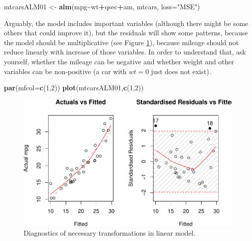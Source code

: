 \documentclass[
]{book}
\newenvironment{Shaded}{\begin{snugshade}}{\end{snugshade}}
\newcommand{\DataTypeTok}[1]{\textcolor[rgb]{0.13,0.29,0.53}{#1}}
\newcommand{\DecValTok}[1]{\textcolor[rgb]{0.00,0.00,0.81}{#1}}
\newcommand{\KeywordTok}[1]{\textcolor[rgb]{0.13,0.29,0.53}{\textbf{#1}}}
\newcommand{\NormalTok}[1]{#1}
\newcommand{\OperatorTok}[1]{\textcolor[rgb]{0.81,0.36,0.00}{\textbf{#1}}}
\newcommand{\StringTok}[1]{\textcolor[rgb]{0.31,0.60,0.02}{#1}}
\theoremstyle{definition}
\theoremstyle{definition}
\theoremstyle{definition}
\theoremstyle{definition}
\theoremstyle{remark}
\begin{document}
\begin{Shaded}
\begin{Highlighting}[]
\NormalTok{mtcarsALM01 \textless{}{-}}\StringTok{ }\KeywordTok{alm}\NormalTok{(mpg}\OperatorTok{\textasciitilde{}}\NormalTok{wt}\OperatorTok{+}\NormalTok{qsec}\OperatorTok{+}\NormalTok{am, mtcars, }\DataTypeTok{loss=}\StringTok{"MSE"}\NormalTok{)}
\end{Highlighting}
\end{Shaded}

Arguably, the model includes important variables (although there might be some others that could improve it), but the residuals will show some patterns, because the model should be multiplicative (see Figure \ref{fig:diagnostics03}), because mileage should not reduce linearly with increase of those variables. In order to understand that, ask yourself, whether the mileage can be negative and whether weight and other variables can be non-positive (a car with \(wt=0\) just does not exist).

\begin{Shaded}
\begin{Highlighting}[]
\KeywordTok{par}\NormalTok{(}\DataTypeTok{mfcol=}\KeywordTok{c}\NormalTok{(}\DecValTok{1}\NormalTok{,}\DecValTok{2}\NormalTok{))}
\KeywordTok{plot}\NormalTok{(mtcarsALM01,}\KeywordTok{c}\NormalTok{(}\DecValTok{1}\NormalTok{,}\DecValTok{2}\NormalTok{))}
\end{Highlighting}
\end{Shaded}

\begin{figure}
\centering
\includegraphics{Svetunkov---Statistics-for-Business-Analytics_files/figure-latex/diagnostics03-1.pdf}
\caption{\label{fig:diagnostics03}Diagnostics of necessary transformations in linear model.}
\end{figure}
\end{document}
